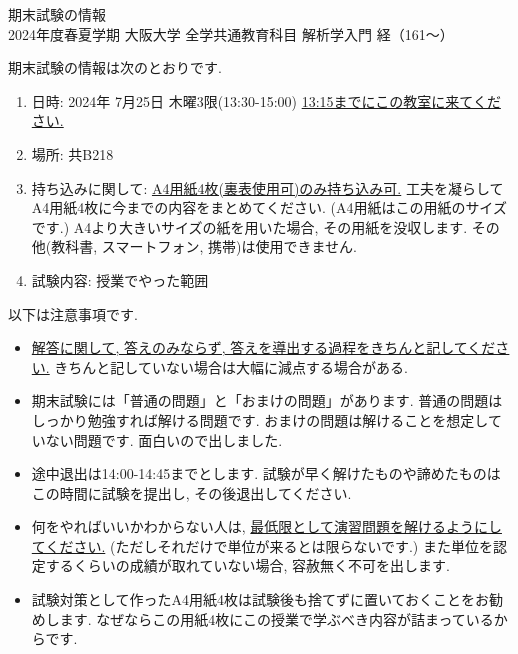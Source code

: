 \documentclass[dvipdfmx,a4paper,11pt]{article}
\theoremstyle{definition}
\begin{document}
\pagestyle{empty}




\begin{center}
{\LARGE 期末試験の情報 } \\

{2024年度春夏学期 大阪大学 全学共通教育科目 解析学入門 経（161〜）}
\end{center}

期末試験の情報は次のとおりです. 
\begin{enumerate}
\item 日時: 2024年 7月25日 木曜3限(13:30-15:00) \underline{13:15までにこの教室に来てください.}
\item 場所: 共B218
\item 持ち込みに関して: \underline{A4用紙4枚(裏表使用可)のみ持ち込み可.} 工夫を凝らしてA4用紙4枚に今までの内容をまとめてください. (A4用紙はこの用紙のサイズです.) A4より大きいサイズの紙を用いた場合, その用紙を没収します. その他(教科書, スマートフォン, 携帯)は使用できません.
\item 試験内容: 授業でやった範囲
\end{enumerate}

以下は注意事項です.
\begin{itemize}
  \setlength{\parskip}{0cm} 
 \setlength{\itemsep}{0cm}
 
 \item \underline{解答に関して, 答えのみならず, 答えを導出する過程をきちんと記してください.} きちんと記していない場合は大幅に減点する場合がある.
 \item 期末試験には「普通の問題」と「おまけの問題」があります. 普通の問題はしっかり勉強すれば解ける問題です. おまけの問題は解けることを想定していない問題です. 面白いので出しました.  

\item 途中退出は14:00-14:45までとします. 試験が早く解けたものや諦めたものはこの時間に試験を提出し, その後退出してください. 
\item 何をやればいいかわからない人は, \underline{最低限として演習問題を解けるようにしてください.} (ただしそれだけで単位が来るとは限らないです.) また単位を認定するくらいの成績が取れていない場合, 容赦無く不可を出します.

\item 試験対策として作ったA4用紙4枚は試験後も捨てずに置いておくことをお勧めします. なぜならこの用紙4枚にこの授業で学ぶべき内容が詰まっているからです. 
\end{itemize}
\end{document}
